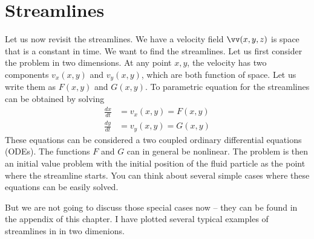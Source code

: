 \section{Streamlines}
Let us now revisit the streamlines.  We have a velocity
field $\vv(x,y,z)$ is space that is a constant in time. We want to
find the streamlines. Let us first consider the problem in two
dimensions. At any point $x,y$, the velocity has two components $v_x(x,y)$
and $v_y(x,y)$, which are both function of space. Let us write them as
$F(x,y)$ and $G(x,y)$. 
 To parametric equation for the streamlines can be
obtained by solving
\begin{subequations}
\begin{align}
\frac{dx}{dt} &= v_x(x,y) = F(x,y ) \\
\frac{dy}{dt} &= v_y(x,y) = G(x,y)
\end{align}
\label{A2.2:2dstream}
\end{subequations}
These equations can be considered a two coupled ordinary
differential equations (ODEs). The functions $F$ and 
$G$ can in general be nonlinear.  The problem is then 
an initial value problem with the initial position of the fluid
particle as the point where the streamline starts. 
 You can think about several simple
cases where these equations can be easily solved. 

But we are not going to discuss those special cases now -- they can be
found in the appendix of this chapter. 
I have plotted several typical examples of streamlines in
 in two dimenions. 
